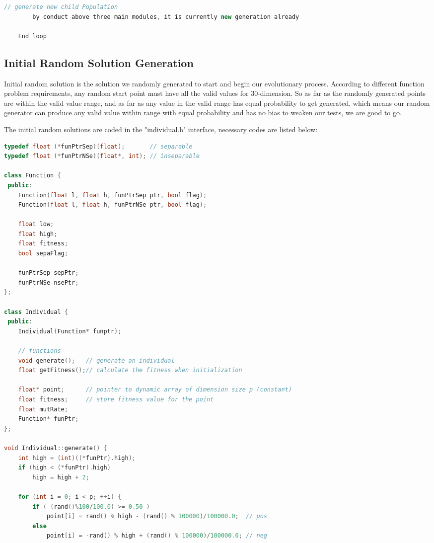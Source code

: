 \documentclass[b5paper,11pt, abstraction, titlepage]{scrartcl}
\begin{document}
\begin{CJK}{UTF8}{gbsn}
\begin{lstlisting}[language=c++]
        // generate new child Population
        by conduct above three main modules, it is currently new generation already

    End loop
\end{lstlisting}

\subsection{Initial Random Solution Generation}
Initial random solution is the solution we randomly generated to start and begin our evolutionary process. According to different function problem requirements, any random start point must have all the valid values for 30-dimension. So as far as the randomly generated points are within the valid value range, and as far as any value in the valid range has equal probability to get generated, which means our random generator can produce any valid value within range with equal probability and has no bias to weaken our tests, we are good to go.

The initial random solutions are coded in the "individual.h" interface, necessary codes are listed below:
\begin{lstlisting}[language=c++]
typedef float (*funPtrSep)(float);       // separable
typedef float (*funPtrNSe)(float*, int); // inseparable

class Function {
 public:
    Function(float l, float h, funPtrSep ptr, bool flag);
    Function(float l, float h, funPtrNSe ptr, bool flag);

    float low;
    float high;
    float fitness;
    bool sepaFlag;
    
    funPtrSep sepPtr;
    funPtrNSe nsePtr;
};

class Individual {
 public:
    Individual(Function* funptr);                    

    // functions
    void generate();   // generate an individual
    float getFitness();// calculate the fitness when initialization

    float* point;      // pointer to dynamic array of dimension size p (constant)
    float fitness;     // store fitness value for the point
    float mutRate;
    Function* funPtr;
};

void Individual::generate() {           
    int high = (int)((*funPtr).high);
    if (high < (*funPtr).high)
        high = high + 2;
            
    for (int i = 0; i < p; ++i) {
        if ( (rand()%100/100.0) >= 0.50 )
            point[i] = rand() % high - (rand() % 100000)/100000.0;  // pos
        else
            point[i] = -rand() % high + (rand() % 100000)/100000.0; // neg


\end{lstlisting}
\end{CJK}
\end{document}
